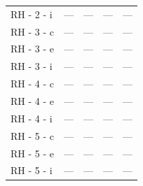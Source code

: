 \documentclass[a4paper,11pt]{article}
\begin{document}
\begin{small}
\begin{longtable}{p{4.5cm}rrrr}
RH - 2 - i & --- & --- & --- & --- \\
RH - 3 - c & --- & --- & --- & --- \\
RH - 3 - e & --- & --- & --- & --- \\
RH - 3 - i & --- & --- & --- & --- \\
RH - 4 - c & --- & --- & --- & --- \\
RH - 4 - e & --- & --- & --- & --- \\
RH - 4 - i & --- & --- & --- & --- \\
RH - 5 - c & --- & --- & --- & --- \\
RH - 5 - e & --- & --- & --- & --- \\
RH - 5 - i & --- & --- & --- & --- \\
\end{longtable}
\end{small}
\end{document}

